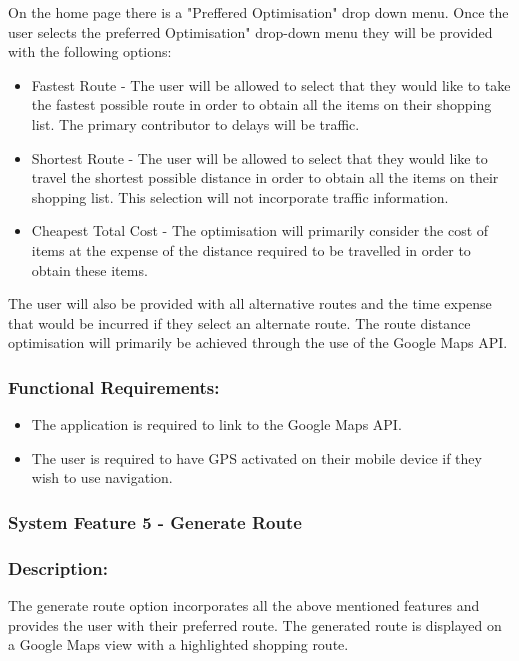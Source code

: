\documentclass[10pt,twocolumn]{witseiepaper}
\begin{document}
		On the home page there is a "Preffered Optimisation" drop down menu. Once the user selects the preferred Optimisation" drop-down menu they will be provided with the following options:
		
		\begin{itemize}
			\item Fastest Route - The user will be allowed to select that they would like to take the fastest possible route in order to obtain all the items on their shopping list. The primary contributor to delays will be traffic.
			\item Shortest Route - The user will be allowed to select that they would like to travel the shortest possible distance in order to obtain all the items on their shopping list. This selection will not incorporate traffic information.
			\item Cheapest Total Cost - The optimisation will primarily consider the cost of items at the expense of the distance required to be travelled in order to obtain these items. 
		\end{itemize}
		
		The user will also be provided with all alternative routes and the time expense that would be incurred if they select an alternate route. The route distance optimisation will primarily be achieved through the use of the Google Maps API.
		
		\subsubsection*{Functional Requirements:}
		
		\begin{itemize}
			\item The application is required to link to the Google Maps API. 
			\item The user is required to have GPS activated on their mobile device if they wish to use navigation.
		\end{itemize}
		
		\subsubsection{System Feature 5 - Generate Route}
		
		\subsubsection*{Description:}
		
		The generate route option incorporates all the above mentioned features and provides the user with their preferred route. The generated route is displayed on a Google Maps view with a highlighted shopping route. 
		
\end{document}
